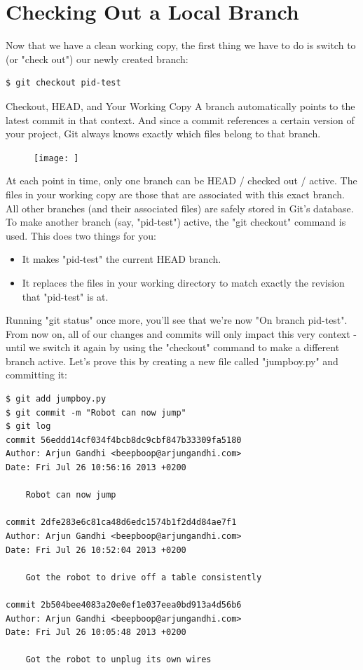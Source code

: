 \documentclass{article}
\begin{document}
\section{Checking Out a Local Branch}
Now that we have a clean working copy, the first thing we have to do is switch to (or "check out") our newly created branch:
\begin{lstlisting}
$ git checkout pid-test
\end{lstlisting}

\begin{concept}
Checkout, HEAD, and Your Working Copy
\newline\newline
A branch automatically points to the latest commit in that context. And since a commit references a certain version of your project, Git always knows exactly which files belong to that branch.
\begin{figure}[h]
    \centering
    \texttt{[image: ]}
\end{figure}
At each point in time, only one branch can be HEAD / checked out / active. The files in your working copy are those that are associated with this exact branch. All other branches (and their associated files) are safely stored in Git's database.
\newline\newline
To make another branch (say, "pid-test") active, the "git checkout" command is used. This does two things for you:
\begin{itemize}
    \item It makes "pid-test" the current HEAD branch.
    \item It replaces the files in your working directory to match exactly the revision that "pid-test" is at.
\end{itemize}
\end{concept}
Running "git status" once more, you'll see that we're now "On branch pid-test". From now on, all of our changes and commits will only impact this very context - until we switch it again by using the "checkout" command to make a different branch active.
\newline\newline
Let's prove this by creating a new file called "jumpboy.py" and committing it:
\begin{lstlisting}
$ git add jumpboy.py
$ git commit -m "Robot can now jump"
$ git log
commit 56eddd14cf034f4bcb8dc9cbf847b33309fa5180
Author: Arjun Gandhi <beepboop@arjungandhi.com>
Date: Fri Jul 26 10:56:16 2013 +0200

    Robot can now jump

commit 2dfe283e6c81ca48d6edc1574b1f2d4d84ae7f1
Author: Arjun Gandhi <beepboop@arjungandhi.com>
Date: Fri Jul 26 10:52:04 2013 +0200

    Got the robot to drive off a table consistently

commit 2b504bee4083a20e0ef1e037eea0bd913a4d56b6
Author: Arjun Gandhi <beepboop@arjungandhi.com>
Date: Fri Jul 26 10:05:48 2013 +0200

    Got the robot to unplug its own wires
\end{lstlisting}
\end{document}
